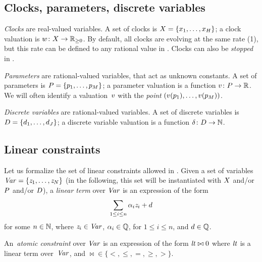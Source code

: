 \subsection{Clocks, parameters, discrete variables}

\emph{Clocks} are real-valued variables.
A set of clocks is $X = \{ x_1, \dots, x_H \}$;
a clock valuation is
$w \colon X \rightarrow {\mathbb R}_{\geq 0}$.
By default, all clocks are evolving at the same rate (1), but this rate can be defined to any rational value in \imitator{}.
Clocks can also be \emph{stopped} in \imitator{}.

\emph{Parameters} are rational-valued variables, that act as unknown constants.
A set of parameters is $P = \{ p_1, \dots, p_M \} $;
a parameter valuation is a function $v\colon P \rightarrow {\mathbb R}$.
We will often identify a valuation~$v$ with the \emph{point} $(v(p_1), \dots, v(p_{M}))$.

\emph{Discrete variables} are rational-valued variables.
A set of discrete variables is $D = \{ d_1, \dots, d_J \} $;
a discrete variable valuation is a function $\delta \colon D \rightarrow {\mathbb N}$.


\subsection{Linear constraints}\label{ss:constraints}

Let us formalize the set of linear constraints allowed in \imitator{}.
Given a set of variables~$\mathit{Var} = \{ \mathit{z}_1, \dots, \mathit{z}_N \}$ (in the following, this set will be instantiated with $X$ and/or $P$ and/or $D$), a \emph{linear term} over $\mathit{Var}$ is an expression of the form
$$
	\sum_{1 \leq i \leq n} \alpha_i \mathit{z}_i + d
$$
for some $n \in {\mathbb N}$,
where
$\mathit{z}_{i} \in \mathit{Var}$,
$\alpha_{i} \in {\mathbb Q}$, for $1 \leq i \leq n$,
and
$d \in {\mathbb Q}$.

An~\emph{atomic constraint} over $\mathit{Var}$ is an expression of the form
$
	\mathit{lt} \bowtie 0
$
where
$\mathit{lt}$ is a linear term over~$\mathit{Var}$,
and
${\bowtie} \in \{ <, \leq, =, \geq, > \}$.

